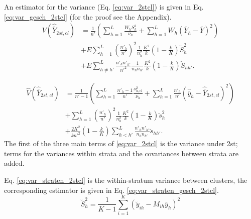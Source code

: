 An estimator for the variance (Eq. \ref{eq:var_2stcl}) is given in Eq. \ref{eq:var_gesch_2stcl} (for the proof see the Appendix). 
\begin{equation}
\begin{aligned}
V\left(\hat{\bar{Y}}_{2st,cl}\right)&=\frac{1}{n'}\left(\sum_{h=1}^{L}\frac{W_h S^2_{h}}{\nu_h}+\sum_{h=1}^{L}W_h(\bar{Y}_h-\bar{Y})^2\right)\\
&+ E\sum_{h=1}^{L}\left(\frac{n'_h}{n'}\right)^2 \frac{1}{n_h^2}\frac{K^2}{k}\left(1-\frac{k}{K}\right)\breve{S}_h^2\\
&+E\sum_{h \neq h'}^{L}\frac{n'_h n'_{h'}}{n'^2}\frac{1}{n_h n_{h'}}\frac{K^2}{k}\left(1-\frac{k}{K}\right)\breve{S}_{hh'}.
\label{eq:var_2stcl}
\end{aligned}
\end{equation}

\begin{equation}
\begin{aligned}
\hat{V}\left(\hat{\bar{Y}}_{2st,cl}\right)&=\frac{1}{n'-1}\left(\sum_{h=1}^{L}\frac{n'_h-1}{n'}\frac{s^2_{h,cl}}{\nu_h}+\sum_{h=1}^{L}\frac{n'_h}{n'}(\hat{\bar{y}}_h-\hat{\bar{Y}}_{2st,cl})^2\right)\\
&+ \sum_{h=1}^{L}\left(\frac{n'_h}{n'}\right)^2 \frac{1}{n_h^2}\frac{K^2}{k}\left(1-\frac{k}{K}\right)\breve{s}_h^2\\
&+\frac{2K^2}{kn'^2}\left(1-\frac{k}{K}\right)\sum_{h<h'}^{L}\frac{n'_h n'_{h'}}{n_h n_{h'}}\breve{s}_{h h'}.    
\label{eq:var_gesch_2stcl}
\end{aligned}
\end{equation}
The first of the three main terms of \eqref{eq:var_2stcl} is the variance under 2st; terms for the variances within strata and the covariances between strata are added. 

Eq. \ref{eq:var_straten_2stcl} is the within-stratum variance between clusters, the corresponding estimator is given in Eq. \ref{eq:var_straten_gesch_2stcl}.
\begin{equation}
 \breve{S}_h^2=\frac{1}{K-1}\sum_{i=1}^K\left(\breve{y}_{ih}-M_{ih}\bar{y}_h\right)^2
\label{eq:var_straten_2stcl}
\end{equation}

